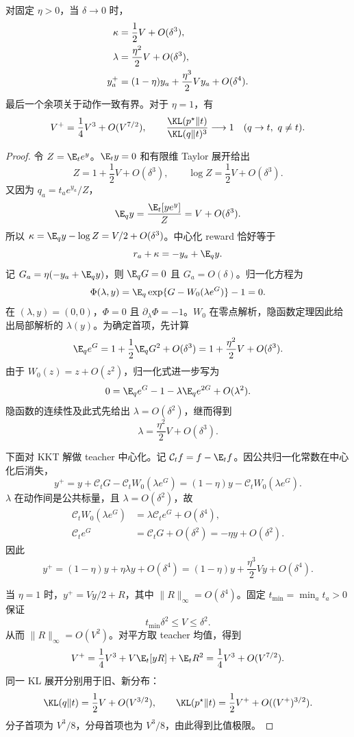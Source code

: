 \begin{theorem}
\label{thm:mean-hard-sync-local-expansion}
对固定 $\eta>0$，当 $\delta\to0$ 时，
\begin{align}
 \kappa&=\frac12V+O(\delta^3),\notag\\
 \lambda&=\frac{\eta^2}{2}V+O(\delta^3),\notag\\
 y_a^+&=(1-\eta)y_a+\frac{\eta^3}{2}Vy_a+O(\delta^4).
 \label{eq:mean-hard-sync-local-expansion}
\end{align}
最后一个余项关于动作一致有界。对于 $\eta=1$，有
\begin{equation}
 V^+=\frac14V^3+O(V^{7/2}),
 \qquad
 \frac{\KL(p^\star\Vert t)}{\KL(q\Vert t)^3}\longrightarrow1
 \quad(q\to t,\ q\ne t).
 \label{eq:mean-hard-sync-kl-cubic}
\end{equation}
\end{theorem}

\begin{proof}
令 $Z=\E_te^y$。$\E_ty=0$ 和有限维 Taylor 展开给出
\[
 Z=1+\frac12V+O(\delta^3),\qquad
 \log Z=\frac12V+O(\delta^3).
\]
又因为 $q_a=t_ae^{y_a}/Z$，
\[
 \E_qy=\frac{\E_t[y e^y]}{Z}=V+O(\delta^3).
\]
所以 $\kappa=\E_qy-\log Z=V/2+O(\delta^3)$。中心化 reward 恰好等于
\[
 r_a+\kappa=-y_a+\E_qy.
\]
记 $G_a=\eta(-y_a+\E_qy)$，则 $\E_qG=0$ 且 $G_a=O(\delta)$。归一化方程为
\[
 \Phi(\lambda,y)
 =\E_q\exp\{G-W_0(\lambda e^G)\}-1=0.
\]
在 $(\lambda,y)=(0,0)$，$\Phi=0$ 且 $\partial_\lambda\Phi=-1$。$W_0$ 在零点解析，隐函数定理因此给出局部解析的 $\lambda(y)$。为确定首项，先计算
\[
 \E_qe^G=1+\frac12\E_qG^2+O(\delta^3)
 =1+\frac{\eta^2}{2}V+O(\delta^3).
\]
由于 $W_0(z)=z+O(z^2)$，归一化式进一步写为
\[
 0=\E_qe^G-1-\lambda\E_qe^{2G}+O(\lambda^2).
\]
隐函数的连续性及此式先给出 $\lambda=O(\delta^2)$，继而得到
\[
 \lambda=\frac{\eta^2}{2}V+O(\delta^3).
\]

下面对 KKT 解做 teacher 中心化。记 $\mathcal C_tf=f-\E_tf$。因公共归一化常数在中心化后消失，
\[
 y^+=y+\mathcal C_tG-\mathcal C_tW_0(\lambda e^G)
 =(1-\eta)y-\mathcal C_tW_0(\lambda e^G).
\]
$\lambda$ 在动作间是公共标量，且 $\lambda=O(\delta^2)$，故
\begin{align*}
 \mathcal C_tW_0(\lambda e^G)
 &=\lambda\mathcal C_te^G+O(\delta^4),\\
 \mathcal C_te^G&=\mathcal C_tG+O(\delta^2)
 =-\eta y+O(\delta^2).
\end{align*}
因此
\[
 y^+=(1-\eta)y+\eta\lambda y+O(\delta^4)
 =(1-\eta)y+\frac{\eta^3}{2}Vy+O(\delta^4).
\]

当 $\eta=1$ 时，$y^+=Vy/2+R$，其中 $\|R\|_\infty=O(\delta^4)$。固定 $t_{\min}=\min_at_a>0$ 保证
\[
 t_{\min}\delta^2\le V\le\delta^2.
\]
从而 $\|R\|_\infty=O(V^2)$。对平方取 teacher 均值，得到
\[
 V^+=\frac14V^3+V\E_t[yR]+\E_tR^2
 =\frac14V^3+O(V^{7/2}).
\]
同一 KL 展开分别用于旧、新分布：
\[
 \KL(q\Vert t)=\frac12V+O(V^{3/2}),
 \qquad
 \KL(p^\star\Vert t)=\frac12V^++O((V^+)^{3/2}).
\]
分子首项为 $V^3/8$，分母首项也为 $V^3/8$，由此得到比值极限。
\end{proof}

